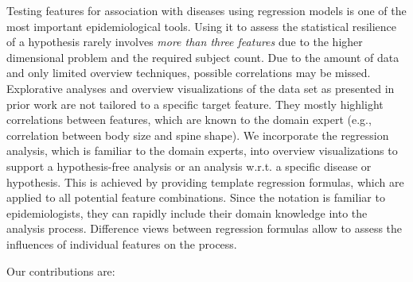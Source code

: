\documentclass[journal]{style/vgtc} 			          %
\begin{document}
Testing features for association with diseases using regression models is one of the most important epidemiological tools.
Using it to assess the statistical resilience of a hypothesis rarely involves \emph{more than three features} due to the higher dimensional problem and the required subject count.
Due to the amount of data and only limited overview techniques, possible correlations may be missed.
Explorative analyses and overview visualizations of the data set as presented in prior work \cite{Klemm2014VIS} are not tailored to a specific target feature.
They mostly highlight correlations between features, which are known to the domain expert (e.g., correlation between body size and spine shape).
We incorporate the regression analysis, which is familiar to the domain experts, into overview visualizations to support a hypothesis-free analysis or an analysis w.r.t. a specific disease or hypothesis.
This is achieved by providing template regression formulas, which are applied to all potential feature combinations.
Since the notation is familiar to epidemiologists, they can rapidly include their domain knowledge into the analysis process.
Difference views between regression formulas allow to assess the influences of individual features on the process.

Our contributions are:
\end{document}
